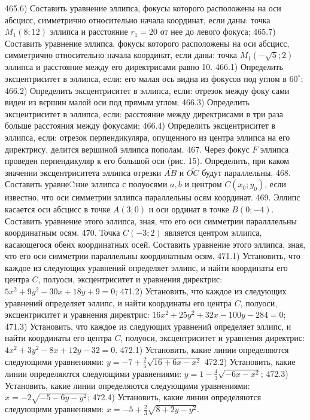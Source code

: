465.6) Составить уравнение эллипса, фокусы которого расположены на оси абсцисс, симметрично относительно начала координат, если даны: точка $M_1(8 ; 12)$ эллипса и расстояние $r_1=20$ от нее до левого фокуса;
465.7) Составить уравнение эллипса, фокусы которого расположены на оси абсцисс, симметрично относительно начала координат, если даны: точка $M_1(-\sqrt{5} ; 2)$ эллипса и расстояние между его директрисами равно 10.
466.1) Определить эксцентриситет в эллипса, если: его малая ось видна из фокусов под углом в $60^{\circ}$;
466.2) Определить эксцентриситет в эллипса, если: отрезок между фоку сами виден из вєршин малой оси под прямым углом;
466.3) Определить эксцентриситет в эллипса, если: расстояние между директрисами в три раза больше расстояния между фокусами;
466.4) Определить эксцентриситет в эллипса, если: отрезок перпендикуляра, опущенного из центра эллипса на его директрису, делится вершиной эллипса пополам.
467. Через фокус $F$ эллипса проведен перпендикуляр к его большой оси (рис. 15). Определить, при каком значении эксцентриситета эллипса отрезки $\overline{A B}$ и $\overline{O C}$ будут параллельны,
468. Составить уравне்ние эллипса с полуосями $a, b$ и центром $C\left(x_0 ; y_0\right)$, если известно, что оси симметрии эллипса параллельны осям координат.
469. Эллипс касается оси абсцисс в точке $A(3 ; 0)$ и оси ординат в точке $B(0 ;-4)$. Составить уравнение этого эллипса, зная, что его оси симметрии паралллельны координатным осям.
470. Точка $C(-3 ; 2)$ является центром эллипса, касающегося обеих координатных осей. Составить уравнение этого эллипса, зная, что его оси симметрии параллельны координатным осям.
471.1) Установить, что каждое из следующих уравнений определяет эллипс, и найти координаты его центра $C$, полуоси, эксцентриситет и уравнения директрис: $5 x^2+9 y^2-30 x+18 y+9=0$;
471.2) Установить, что каждое из следующих уравнений определяет эллипс, и найти координаты его центра $C$, полуоси, эксцентриситет и уравнения директрис: $16 x^2+25 y^2+32 x-100 y-284=0$;
471.3) Установить, что каждое из следующих уравнений определяет эллипс, и найти координаты его центра $C$, полуоси, эксцентриситет и уравнения директрис: $4 x^2+3 y^2-8 x+12 y-32=0$.
472.1) Установить, какие линии определяются следующими уравнениями: $y=-7+\frac{2}{5} \sqrt{16+6 x-x^2}$
472.2) Установить, какие линии определяются следующими уравнениями: $y=1-\frac{4}{3} \sqrt{-6 x-x^2}$;
472.3) Установить, какие линии определяются следующими уравнениями: $x=-2 \sqrt{-5-6 y-y^2}$;
472.4) Установить, какие линии определяются следующими уравнениями: $x=-5+\frac{2}{3} \sqrt{8+2 y-y^2}$.

